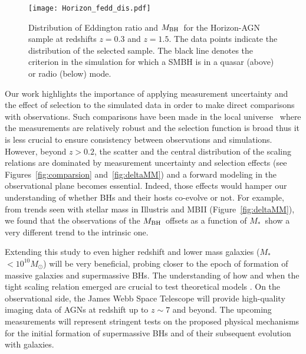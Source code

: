 \documentclass[twocolumn]{aastex631}
\def\smass{{$M_*$}}
\def\mbh{$M_{\rm BH}$}
\begin{document}
\begin{figure}
\centering
\texttt{[image: Horizon\_fedd\_dis.pdf]}\\
\caption{\label{fig:fedd} 
Distribution of Eddington ratio and \mbh\ for the Horizon-AGN sample at redshifts $z=0.3$ and $z=1.5$. The data points indicate the distribution of the selected sample. The black line denotes the criterion in the simulation for which a SMBH is in a quasar (above) or radio (below) mode.}
\end{figure} 

Our work highlights the importance of applying measurement uncertainty and the effect of selection to the simulated data in order to make direct comparisons with observations. Such comparisons have been made in the local universe~\citep[e.g.,][]{Habouzit2021} where the measurements are relatively robust and the selection function is broad thus it is less crucial to ensure consistency between observations and simulations. However, beyond $z>0.2$, the scatter and the central distribution of the scaling relations are dominated by measurement uncertainty and selection effects (see Figures~\ref{fig:comparsion} and~\ref{fig:deltaMM}) and a forward modeling in the observational plane becomes essential. Indeed, those effects would hamper our understanding of whether BHs and their hosts co-evolve or not. For example, from trends seen with stellar mass in Illustris and MBII (Figure~\ref{fig:deltaMM}), we found that the observations of the \mbh\ offsets as a function of \smass\  show a very different trend to the intrinsic one.


Extending this study to even higher redshift and lower mass galaxies (\smass\ $<10^{10}M_{\odot}$) will be very beneficial, probing closer to the epoch of formation of massive galaxies and supermassive BHs. The understanding of how and when the tight scaling relation emerged are crucial to test theoretical models \citep{Volonteri2021}. On the observational side, the James Webb Space Telescope will provide high-quality imaging data of AGNs at redshift up to $z\sim7$ and beyond. The upcoming measurements will represent stringent tests on the proposed physical mechanisms for the initial formation of supermassive BHs and of their subsequent evolution with galaxies.
\end{document}
